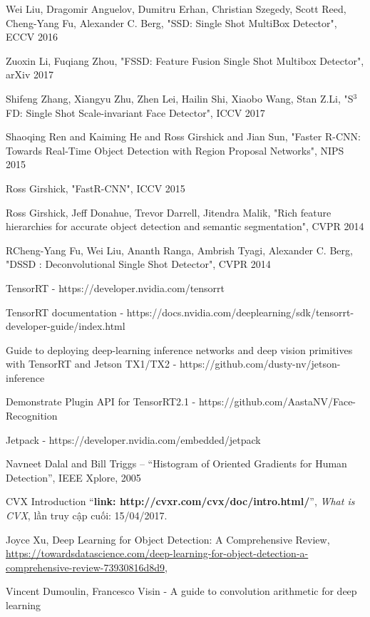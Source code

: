 \documentclass[a4paper]{report}
\begin{document}
\begin{thebibliography}{80}

Wei Liu, Dragomir Anguelov, Dumitru Erhan, Christian Szegedy, Scott Reed, Cheng-Yang Fu, Alexander C. Berg, "SSD: Single Shot MultiBox Detector", ECCV 2016

Zuoxin Li, Fuqiang Zhou, "FSSD: Feature Fusion Single Shot Multibox Detector", arXiv 2017

 Shifeng Zhang, Xiangyu Zhu, Zhen Lei, Hailin Shi, Xiaobo Wang, Stan Z.Li, "S$^ 3$FD: Single Shot Scale-invariant Face Detector", ICCV 2017

 Shaoqing Ren and Kaiming He and Ross Girshick and Jian Sun, "Faster {R-CNN}: Towards Real-Time Object Detection
with Region Proposal Networks", NIPS 2015

 Ross Girshick, "Fast{R-CNN}", ICCV 2015

 Ross Girshick, Jeff Donahue, Trevor Darrell, Jitendra Malik, "Rich feature hierarchies for accurate object detection and semantic segmentation", CVPR 2014 

 RCheng-Yang Fu, Wei Liu, Ananth Ranga, Ambrish Tyagi, Alexander C. Berg, "DSSD : Deconvolutional Single Shot Detector", CVPR 2014 

 TensorRT - https://developer.nvidia.com/tensorrt

 TensorRT documentation - https://docs.nvidia.com/deeplearning/sdk/tensorrt-developer-guide/index.html 

 Guide to deploying deep-learning inference networks and deep vision primitives with TensorRT and Jetson TX1/TX2 - https://github.com/dusty-nv/jetson-inference 

 Demonstrate Plugin API for TensorRT2.1 -  https://github.com/AastaNV/Face-Recognition 

 Jetpack - https://developer.nvidia.com/embedded/jetpack  

 Navneet Dalal and Bill Triggs – “Histogram of Oriented Gradients for Human Detection”, IEEE Xplore, 2005


CVX Introduction
``\textbf{link: http://cvxr.com/cvx/doc/intro.html/}'',
\textit{What is CVX}, lần truy cập cuối: 15/04/2017.

Joyce Xu, Deep Learning for Object Detection: A Comprehensive Review,\\
\href {https://towardsdatascience.com/deep-learning-for-object-detection-a-comprehensive-review-73930816d8d9}{https://towardsdatascience.com/deep-learning-for-object-detection-a-comprehensive-review-73930816d8d9},

Vincent Dumoulin, Francesco Visin - A guide to convolution arithmetic for deep learning 
\end{thebibliography}
\end{document}
